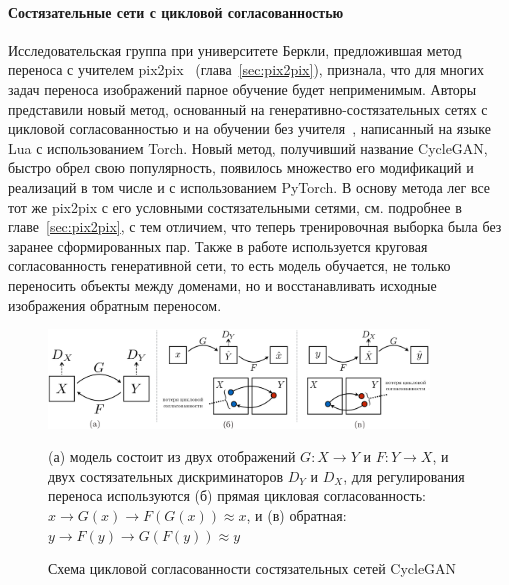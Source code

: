 \documentclass[11pt,a4paper]{extarticle}
\begin{document}
		\paragraph{Состязательные сети с цикловой согласованностью}

			Исследовательская группа при университете Беркли, предложившая метод переноса с учителем pix2pix~\cite{pix2pix} (глава~\ref{sec:pix2pix}),
			признала, что для многих задач переноса изображений парное обучение будет неприменимым.
			Авторы представили новый метод, основанный на генеративно-состязательных сетях с цикловой согласованностью и на обучении без учителя~\cite{CycleGAN}, написанный на языке Lua с использованием Torch.
			Новый метод, получивший название CycleGAN, быстро обрел свою популярность, появилось множество его модификаций и реализаций в том числе и с использованием PyTorch.
			\newline
			\newline
			В основу метода лег все тот же pix2pix с его условными состязательными сетями, см. подробнее в главе~\ref{sec:pix2pix}, с тем отличием, что теперь тренировочная выборка была без заранее сформированных пар.
			Также в работе используется круговая согласованность генеративной сети, то есть модель обучается, не только переносить объекты между доменами, но и восстанавливать исходные изображения обратным переносом.
			
			\begin{figure}[ht]
				\centering
				\includegraphics[width=0.9\textwidth]{img/cyclegan}
				\caption{Схема цикловой согласованности состязательных сетей CycleGAN}{
					\small{
						(а) модель состоит из двух отображений \(G: X \rightarrow Y\) и \(F: Y \rightarrow X\), и двух состязательных дискриминаторов \(D_Y\) и \(D_X\),
						для регулирования переноса используются (б) прямая цикловая согласованность: \(x \rightarrow G(x) \rightarrow F(G(x)) \approx x \),
						и (в) обратная: \(y \rightarrow F(y) \rightarrow G(F(y)) \approx y \)
					}}
				\label{pic:cyclegan}
			\end{figure}
\end{document}
